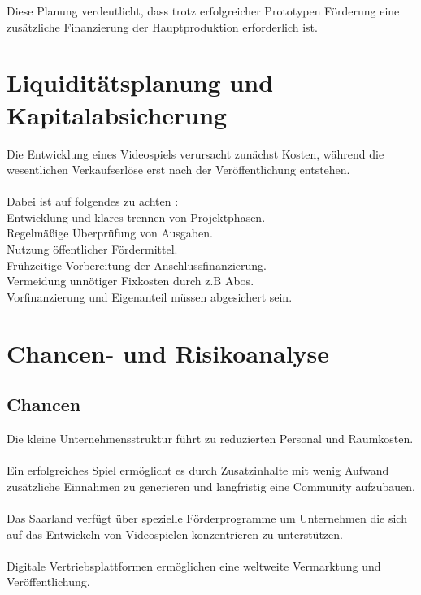 \documentclass[envcountsame,envcountchap deutsch]{i-studis}
\begin{document}
Diese Planung verdeutlicht, dass trotz erfolgreicher Prototypen Förderung eine zusätzliche Finanzierung der Hauptproduktion erforderlich ist.

\chapter{Liquiditätsplanung und Kapitalabsicherung}

Die Entwicklung eines Videospiels verursacht zunächst Kosten, während die wesentlichen Verkaufserlöse erst nach der Veröffentlichung entstehen.
\\
\\
Dabei ist auf folgendes zu achten :\\
Entwicklung und klares trennen von Projektphasen.\\
Regelmäßige Überprüfung von Ausgaben.\\
Nutzung öffentlicher Fördermittel.\\
Frühzeitige Vorbereitung der Anschlussfinanzierung.\\
Vermeidung unnötiger Fixkosten durch z.B Abos.\\

Vorfinanzierung und Eigenanteil müssen abgesichert sein.\\

\chapter{Chancen- und Risikoanalyse}
\section{Chancen}
Die kleine Unternehmensstruktur führt zu reduzierten Personal und Raumkosten.\\\\

Ein erfolgreiches Spiel ermöglicht es durch Zusatzinhalte mit wenig Aufwand zusätzliche Einnahmen zu generieren und langfristig eine Community aufzubauen.\\\\

Das Saarland verfügt über spezielle Förderprogramme um Unternehmen die sich auf das Entwickeln von Videospielen konzentrieren zu unterstützen. \\\\

Digitale Vertriebsplattformen ermöglichen eine weltweite Vermarktung und Veröffentlichung.\\\\
\end{document}
